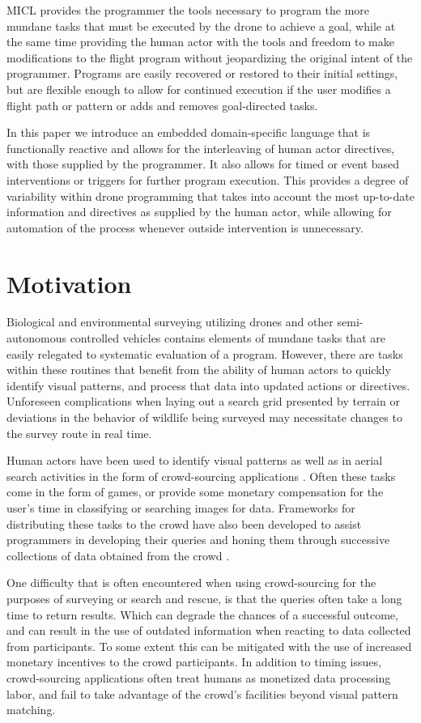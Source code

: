 \documentclass{sig-alternate-05-2015}
\begin{document}
MICL provides the programmer the tools necessary to program the more mundane
tasks that must be executed by the drone to achieve a goal, while at the same
time providing the human actor with the tools and freedom to make
modifications to the flight program without jeopardizing the original intent
of the programmer. Programs are easily recovered or restored to their initial
settings, but are flexible enough to allow for continued execution if the user
modifies a flight path or pattern or adds and removes goal-directed tasks.

In this paper we introduce an embedded domain-specific language that is
functionally reactive and allows for the interleaving of human actor
directives, with those supplied by the programmer. It also allows for timed or
event based interventions or triggers for further program execution. This
provides a degree of variability within drone programming that takes into
account the most up-to-date information and directives as supplied by the
human actor, while allowing for automation of the process whenever outside
intervention is unnecessary.


\section{Motivation}
\label{sec:motivation}
Biological and environmental surveying utilizing drones and other semi-autonomous
controlled vehicles contains elements of mundane tasks that are easily
relegated to systematic evaluation of a program. However, there are tasks
within these routines that benefit from the ability of human actors to quickly
identify visual patterns, and process that data into updated actions or
directives. Unforeseen complications when laying out a search grid presented
by terrain or deviations in the behavior of wildlife being surveyed may
necessitate changes to the survey route in real time.

Human actors have been used to identify visual patterns as well as in aerial
search activities in the form of crowd-sourcing applications
\cite{quinn2011hc}. Often these tasks come in the form of games, or provide
some monetary compensation for the user's time in classifying or searching
images for data. Frameworks for distributing these tasks to the crowd have
also been developed to assist programmers in developing their queries and
honing them through successive collections of data obtained from the crowd
\cite{little2010turkit}.

One difficulty that is often encountered when using crowd-sourcing for the
purposes of surveying or search and rescue, is that the queries often take a
long time to return results. Which can degrade the chances of a successful
outcome, and can result in the use of outdated information when reacting to
data collected from participants. To some extent this can be mitigated with
the use of increased monetary incentives to the crowd participants. In
addition to timing issues, crowd-sourcing applications often treat humans as
monetized data processing labor, and fail to take advantage of the crowd's
facilities beyond visual pattern matching.
\end{document}
